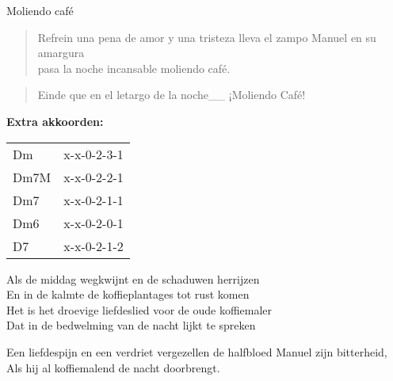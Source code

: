 \begin{song}[tropical]{Moliendo café}
\begin{verse}{Refrein}
una pena de amor y una tristeza lleva el zampo Manuel en su amargura\\
pasa la noche incansable moliendo café.\hspace{1em}\chord{$\downarrow\downarrow$}\hspace{1.5em}\chord{$\downarrow\downarrow$}
\end{verse}

\begin{verse}{Einde}
que en el letargo de la noche\_\_ ¡Moliendo Café!
\end{verse}
\end{song}
\vspace{5cm}
\textbf{Extra akkoorden:}\\
\begin{tabular}{ll}
Dm & x-x-0-2-3-1 \\ 
Dm7M &  x-x-0-2-2-1 \\ 
Dm7 & x-x-0-2-1-1 \\ 
Dm6 &  x-x-0-2-0-1 \\ 
D7 & x-x-0-2-1-2 \\ 
\end{tabular} 

\clearpage
\begin{translation}
Als de middag wegkwijnt en de schaduwen herrijzen\\
En in de kalmte de koffieplantages tot rust komen\\
Het is het droevige liefdeslied voor de oude koffiemaler\\
Dat in de bedwelming van de nacht lijkt te spreken\vspace{\wlskip}

Een liefdespijn en een verdriet vergezellen de halfbloed Manuel zijn bitterheid,\\
Als hij al koffiemalend de nacht doorbrengt.\\
\end{translation}
